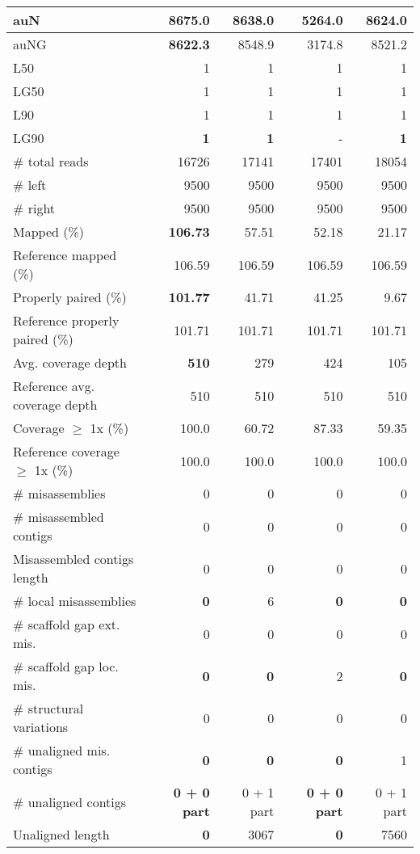 \documentclass[12pt,a4paper]{article}
\begin{document}
\begin{table}[ht]
\begin{center}
\begin{tabular}{|l*{4}{|r}|}
auN & {\bf 8675.0} & 8638.0 & 5264.0 & 8624.0 \\ \hline
auNG & {\bf 8622.3} & 8548.9 & 3174.8 & 8521.2 \\ \hline
L50 & 1 & 1 & 1 & 1 \\ \hline
LG50 & 1 & 1 & 1 & 1 \\ \hline
L90 & 1 & 1 & 1 & 1 \\ \hline
LG90 & {\bf 1} & {\bf 1} & - & {\bf 1} \\ \hline
\# total reads & 16726 & 17141 & 17401 & 18054 \\ \hline
\# left & 9500 & 9500 & 9500 & 9500 \\ \hline
\# right & 9500 & 9500 & 9500 & 9500 \\ \hline
Mapped (\%) & {\bf 106.73} & 57.51 & 52.18 & 21.17 \\ \hline
Reference mapped (\%) & 106.59 & 106.59 & 106.59 & 106.59 \\ \hline
Properly paired (\%) & {\bf 101.77} & 41.71 & 41.25 & 9.67 \\ \hline
Reference properly paired (\%) & 101.71 & 101.71 & 101.71 & 101.71 \\ \hline
Avg. coverage depth & {\bf 510} & 279 & 424 & 105 \\ \hline
Reference avg. coverage depth & 510 & 510 & 510 & 510 \\ \hline
Coverage $\geq$ 1x (\%) & 100.0 & 60.72 & 87.33 & 59.35 \\ \hline
Reference coverage $\geq$ 1x (\%) & 100.0 & 100.0 & 100.0 & 100.0 \\ \hline
\# misassemblies & 0 & 0 & 0 & 0 \\ \hline
\# misassembled contigs & 0 & 0 & 0 & 0 \\ \hline
Misassembled contigs length & 0 & 0 & 0 & 0 \\ \hline
\# local misassemblies & {\bf 0} & 6 & {\bf 0} & {\bf 0} \\ \hline
\# scaffold gap ext. mis. & 0 & 0 & 0 & 0 \\ \hline
\# scaffold gap loc. mis. & {\bf 0} & {\bf 0} & 2 & {\bf 0} \\ \hline
\# structural variations & 0 & 0 & 0 & 0 \\ \hline
\# unaligned mis. contigs & {\bf 0} & {\bf 0} & {\bf 0} & 1 \\ \hline
\# unaligned contigs & {\bf 0 + 0 part} & 0 + 1 part & {\bf 0 + 0 part} & 0 + 1 part \\ \hline
Unaligned length & {\bf 0} & 3067 & {\bf 0} & 7560 \\ \hline

\end{tabular}
\end{center}
\end{table}
\end{document}
